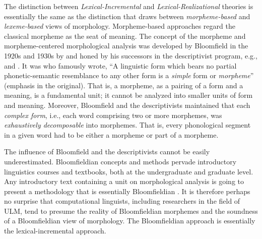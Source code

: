 The distinction between \emph{Lexical-Incremental} 
and \emph{Lexical-Realizational} 
theories is essentially the same as the distinction 
that \cite{aronoff:1994} draws
between \emph{morpheme-based} and \emph{lexeme-based} 
views of morphology. Morpheme-based approaches regard 
the classical morpheme as the seat of meaning.
The concept of the morpheme and morpheme-centered morphological analysis
was developed by Bloomfield in the 1920s and 1930s by
\citet{bloomfield:1926, bloomfield:1933} and honed by his 
successors in the descriptivist program, e.g., 
\cite{hockett:1947} and \cite{harris:1955}.
It was \citet[][p. 161]{bloomfield:1933} who famously wrote, ``A linguistic form 
which bears no partial phonetic-semantic resemblance to any other form is a \emph{simple} form or \emph{morpheme}'' (emphasis in the original). 
That is, a morpheme, as a pairing of a form and a meaning, is a fundamental unit; it cannot be analyzed into smaller units
of form and meaning.
Moreover, Bloomfield and the descriptivists maintained that
each \emph{complex form}, i.e., each word comprising 
two or more morphemes, was \emph{exhaustively decomposable} 
into morphemes. That is, every phonological segment
in a given word had to be either a morpheme or part of a morpheme. 

The influence of Bloomfield and the descriptivists
cannot be easily underestimated. Bloomfieldian concepts and methods 
pervade introductory linguistics courses and textbooks, both at
the undergraduate and graduate level. Any introductory text containing 
a unit on morphological analysis is going to present a methodology that 
is essentially Bloomfieldian \citep{anderson:2017}.
It is therefore perhaps no surprise that
computational linguists, including researchers in the field of ULM, 
tend to presume
the reality of Bloomfieldian morphemes and the soundness of a 
Bloomfieldian view of morphology. The Bloomfieldian approach is essentially
the lexical-incremental approach.

